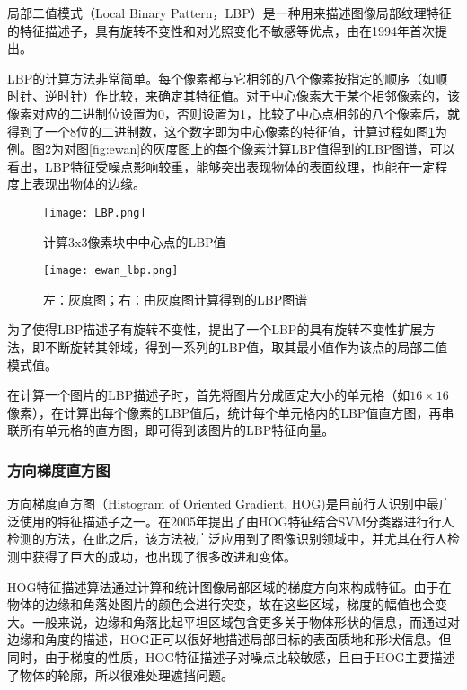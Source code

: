   局部二值模式（Local Binary Pattern，LBP）是一种用来描述图像局部纹理特征的特征描述子，具有旋转不变性和对光照变化不敏感等优点，由\citet{ojala1994performance}在1994年首次提出。

  LBP的计算方法非常简单。每个像素都与它相邻的八个像素按指定的顺序（如顺时针、逆时针）作比较，来确定其特征值。对于中心像素大于某个相邻像素的，该像素对应的二进制位设置为0，否则设置为1，比较了中心点相邻的八个像素后，就得到了一个8位的二进制数，这个数字即为中心像素的特征值，计算过程如图\ref{fig:lbp_procedure}为例。图\ref{fig:lbp}为对图\ref{fig:ewan}的灰度图上的每个像素计算LBP值得到的LBP图谱，可以看出，LBP特征受噪点影响较重，能够突出表现物体的表面纹理，也能在一定程度上表现出物体的边缘。

\begin{figure}[htb]
  \centering
  \texttt{[image: LBP.png]}
  \caption{计算3x3像素块中中心点的LBP值}
  \label{fig:lbp_procedure}
\end{figure}

\begin{figure}[htb]
  \centering
  \texttt{[image: ewan\_lbp.png]}
  \caption{左：灰度图；右：由灰度图计算得到的LBP图谱}
  \label{fig:lbp}
\end{figure}

  为了使得LBP描述子有旋转不变性，\citet{ojala2002multiresolution}提出了一个LBP的具有旋转不变性扩展方法，即不断旋转其邻域，得到一系列的LBP值，取其最小值作为该点的局部二值模式值。

  在计算一个图片的LBP描述子时，首先将图片分成固定大小的单元格（如$16\times16$像素），在计算出每个像素的LBP值后，统计每个单元格内的LBP值直方图，再串联所有单元格的直方图，即可得到该图片的LBP特征向量。

\subsubsection{方向梯度直方图}

  方向梯度直方图（Histogram of Oriented Gradient, HOG)是目前行人识别中最广泛使用的特征描述子之一。\citet{dalal2005histograms}在2005年提出了由HOG特征结合SVM分类器进行行人检测的方法，在此之后，该方法被广泛应用到了图像识别领域中，并尤其在行人检测中获得了巨大的成功，也出现了很多改进和变体。

  HOG特征描述算法通过计算和统计图像局部区域的梯度方向来构成特征。由于在物体的边缘和角落处图片的颜色会进行突变，故在这些区域，梯度的幅值也会变大。一般来说，边缘和角落比起平坦区域包含更多关于物体形状的信息，而通过对边缘和角度的描述，HOG正可以很好地描述局部目标的表面质地和形状信息。但同时，由于梯度的性质，HOG特征描述子对噪点比较敏感，且由于HOG主要描述了物体的轮廓，所以很难处理遮挡问题。

